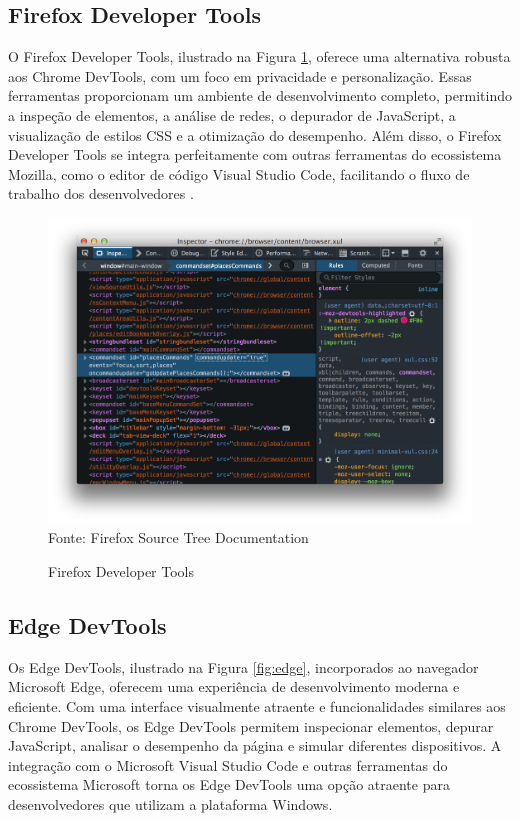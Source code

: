 \subsection{Firefox Developer Tools}
O Firefox Developer Tools, ilustrado na Figura \ref{fig:firefox}, oferece uma alternativa robusta aos Chrome DevTools, com um foco em privacidade e personalização. Essas ferramentas proporcionam um ambiente de desenvolvimento completo, permitindo a inspeção de elementos, a análise de redes, o depurador de JavaScript, a visualização de estilos CSS e a otimização do desempenho. Além disso, o Firefox Developer Tools se integra perfeitamente com outras ferramentas do ecossistema Mozilla, como o editor de código Visual Studio Code, facilitando o fluxo de trabalho dos desenvolvedores \cite{firefox}.
\begin{figure}[!htb]
    \centering
    \caption{Firefox Developer Tools}
    \includegraphics[width=0.8\linewidth]{../figuras/firefox.png}\\
    {\footnotesize Fonte: Firefox Source Tree Documentation}
    \label{fig:firefox}
\end{figure}

\subsection{Edge DevTools}
Os Edge DevTools, ilustrado na Figura \ref{fig:edge}, incorporados ao navegador Microsoft Edge, oferecem uma experiência de desenvolvimento moderna e eficiente. Com uma interface visualmente atraente e funcionalidades similares aos Chrome DevTools, os Edge DevTools permitem inspecionar elementos, depurar JavaScript, analisar o desempenho da página e simular diferentes dispositivos. A integração com o Microsoft Visual Studio Code e outras ferramentas do ecossistema Microsoft torna os Edge DevTools uma opção atraente para desenvolvedores que utilizam a plataforma Windows\cite{edge}.

